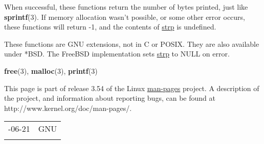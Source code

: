 \documentclass[]{article}
\let\realtextbf=\textbf
\renewcommand{\textbf}[1]{\textcolor{boldcolor}{\realtextbf{#1}}}
\renewcommand{\emph}[1]{\underline{#1}}
\begin{document}
When successful, these functions return the number of bytes printed,
just like \textbf{sprintf}(3). If memory allocation wasn't possible, or
some other error occurs, these functions will return -1, and the
contents of \emph{strp} is undefined.


These functions are GNU extensions, not in C or POSIX. They are also
available under *BSD. The FreeBSD implementation sets \emph{strp} to
NULL on error.


\textbf{free}(3), \textbf{malloc}(3), \textbf{printf}(3)


This page is part of release 3.54 of the Linux \emph{man-pages} project.
A description of the project, and information about reporting bugs, can
be found at http://www.kernel.org/doc/man-pages/.

\begin{longtable}[c]{@{}ll@{}}
\toprule\addlinespace
2013-06-21 & GNU
\\\addlinespace
\bottomrule
\end{longtable}
\end{document}

